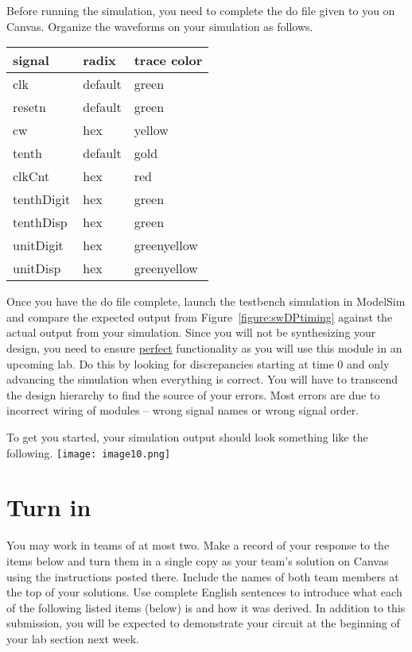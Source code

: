 \hypertarget{link:swDpSim}{}{{}
Before running the simulation, you need to complete the
do file given to you on Canvas.  Organize the waveforms
on your simulation as follows. 

\begin{tabular}{p{3cm}p{3cm}p{3cm}}
signal & radix & trace color \\ \hline
  clk 		& default 	& green  \\
  resetn 		& default 	& green  \\
  cw 		& hex 		& yellow  \\
  tenth 		& default 	& gold  \\
  clkCnt 		& hex 		& red  \\
  tenthDigit 	& hex 		& green  \\
  tenthDisp 	& hex 		& green  \\
  unitDigit 	& hex 		& greenyellow  \\
  unitDisp 	& hex 		& greenyellow  \\
\end{tabular}

Once you have the do file complete, launch the testbench
simulation in ModelSim and compare the expected output 
from Figure~\ref{figure:swDPtiming} against the actual 
output from your simulation.  Since you will not be synthesizing
your design, you need to ensure \underline{perfect} functionality
as you will use this module in an upcoming lab.  Do this by
looking for discrepancies starting at time 0 and only advancing 
the simulation when everything is correct. You will
have to transcend the design hierarchy to find the source of your
errors. Most errors are due to incorrect wiring of modules --
wrong signal names or wrong signal order. 

To get you started, your simulation output should look something like
the following.
\texttt{[image:  image10.png]}

\section{Turn in}

You may work in teams of at most two. Make a record of your response to
the items below and turn them in a single copy as your team's solution
on Canvas using the instructions posted there. Include the names of both
team members at the top of your solutions. Use complete English
sentences to introduce what each of the following listed items (below)
is and how it was derived. In addition to this submission, you will be
expected to demonstrate your circuit at the beginning of your lab
section next week.

}
